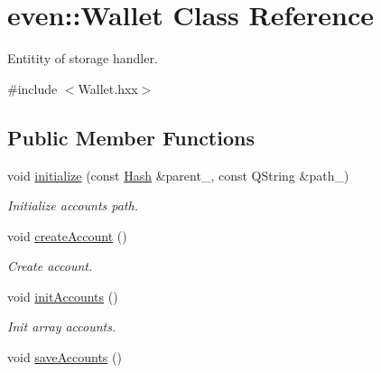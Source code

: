\hypertarget{classeven_1_1_wallet}{}\section{even\+:\+:Wallet Class Reference}
\label{classeven_1_1_wallet}


Entitity of storage handler.  




{\ttfamily \#include $<$Wallet.\+hxx$>$}

\subsection*{Public Member Functions}
\begin{DoxyCompactItemize}
\item 
\mbox{\label{classeven_1_1_wallet_a76e6919ebccf369f3e3a818841cba47d}} 
void \mbox{\hyperlink{classeven_1_1_wallet_a76e6919ebccf369f3e3a818841cba47d}{initialize}} (const \mbox{\hyperlink{classeven_1_1_hash}{Hash}} \&parent\+\_\+, const Q\+String \&path\+\_\+)
\begin{DoxyCompactList}\small\item\em Initialize accounts path. \end{DoxyCompactList}\item 
\mbox{\label{classeven_1_1_wallet_a47fbc417f6898e2eb59a4618c421b481}} 
void \mbox{\hyperlink{classeven_1_1_wallet_a47fbc417f6898e2eb59a4618c421b481}{create\+Account}} ()
\begin{DoxyCompactList}\small\item\em Create account. \end{DoxyCompactList}\item 
\mbox{\label{classeven_1_1_wallet_a1993520443816e73e39756579ebff6f8}} 
void \mbox{\hyperlink{classeven_1_1_wallet_a1993520443816e73e39756579ebff6f8}{init\+Accounts}} ()
\begin{DoxyCompactList}\small\item\em Init array accounts. \end{DoxyCompactList}\item 
\mbox{\label{classeven_1_1_wallet_ab24a9bf5030a71612f778f1e327fa687}} 
void \mbox{\hyperlink{classeven_1_1_wallet_ab24a9bf5030a71612f778f1e327fa687}{save\+Accounts}} ()

\end{DoxyCompactItemize}
